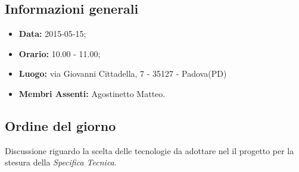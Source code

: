 \subsection{Informazioni generali}
\begin{itemize}
	\item \textbf{Data:} 2015-05-15;
	\item \textbf{Orario:} 10.00 - 11.00;
	\item \textbf{Luogo:} via Giovanni Cittadella, 7 - 35127 - Padova(PD)
	\item \textbf{Membri Assenti:} Agostinetto Matteo.
\end{itemize}

\subsection{Ordine del giorno}
Discussione riguardo la scelta delle tecnologie da adottare nel il progetto per la stesura della \textit{Specifica Tecnica}.

